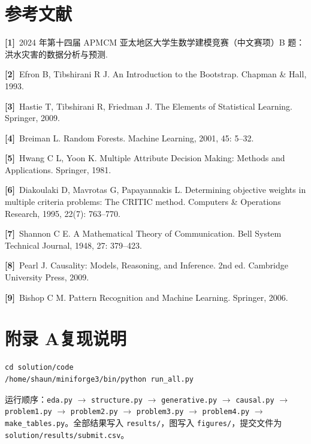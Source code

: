 \documentclass{article}
\begin{document}
\section*{参考文献}

\noindent\textbf{[1]}\ 2024 年第十四届 APMCM 亚太地区大学生数学建模竞赛（中文赛项）B 题：洪水灾害的数据分析与预测.

\noindent\textbf{[2]}\ Efron B, Tibshirani R J. An Introduction to the Bootstrap. Chapman \& Hall, 1993.

\noindent\textbf{[3]}\ Hastie T, Tibshirani R, Friedman J. The Elements of Statistical Learning. Springer, 2009.

\noindent\textbf{[4]}\ Breiman L. Random Forests. Machine Learning, 2001, 45: 5--32.

\noindent\textbf{[5]}\ Hwang C L, Yoon K. Multiple Attribute Decision Making: Methods and Applications. Springer, 1981.

\noindent\textbf{[6]}\ Diakoulaki D, Mavrotas G, Papayannakis L. Determining objective weights in multiple criteria problems: The CRITIC method. Computers \& Operations Research, 1995, 22(7): 763--770.

\noindent\textbf{[7]}\ Shannon C E. A Mathematical Theory of Communication. Bell System Technical Journal, 1948, 27: 379--423.

\noindent\textbf{[8]}\ Pearl J. Causality: Models, Reasoning, and Inference. 2nd ed. Cambridge University Press, 2009.

\noindent\textbf{[9]}\ Bishop C M. Pattern Recognition and Machine Learning. Springer, 2006.



\section*{附录 A\quad 复现说明}

\begin{verbatim}
cd solution/code
/home/shaun/miniforge3/bin/python run_all.py
\end{verbatim}

运行顺序：\texttt{eda.py} $\to$ \texttt{structure.py} $\to$ \texttt{generative.py} $\to$ \texttt{causal.py} $\to$ \texttt{problem1.py} $\to$ \texttt{problem2.py} $\to$ \texttt{problem3.py} $\to$ \texttt{problem4.py} $\to$ \texttt{make\_tables.py}。全部结果写入 \texttt{results/}，图写入 \texttt{figures/}，提交文件为 \texttt{solution/results/submit.csv}。
\end{document}
